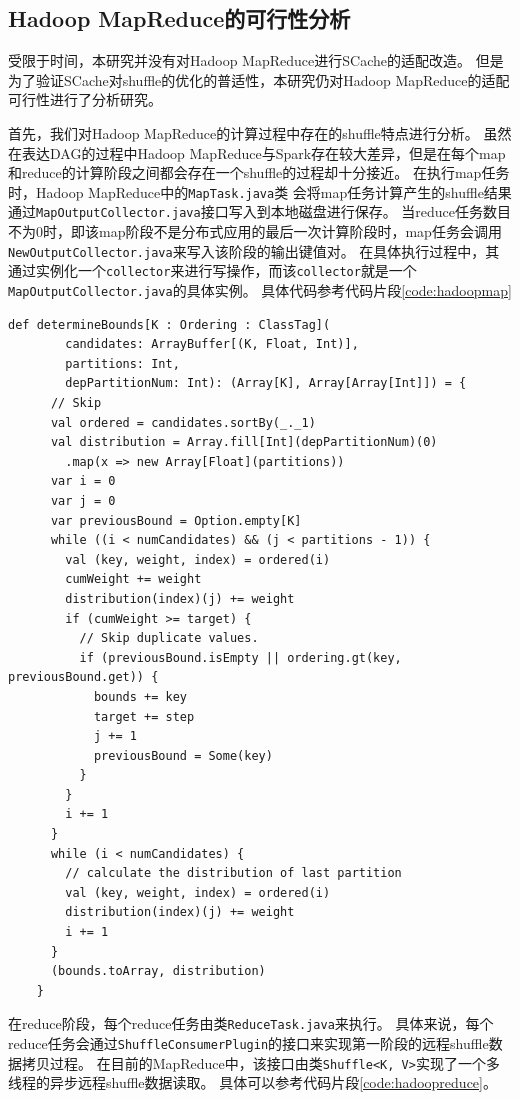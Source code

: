 \subsection{Hadoop MapReduce的可行性分析}

受限于时间，本研究并没有对Hadoop MapReduce进行SCache的适配改造。
但是为了验证SCache对shuffle的优化的普适性，本研究仍对Hadoop MapReduce的适配可行性进行了分析研究。

首先，我们对Hadoop MapReduce的计算过程中存在的shuffle特点进行分析。
虽然在表达DAG的过程中Hadoop MapReduce与Spark存在较大差异，但是在每个map和reduce的计算阶段之间都会存在一个shuffle的过程却十分接近。
在执行map任务时，Hadoop MapReduce中的\verb|MapTask.java|类
会将map任务计算产生的shuffle结果通过\verb|MapOutputCollector.java|接口写入到本地磁盘进行保存。
当reduce任务数目不为0时，即该map阶段不是分布式应用的最后一次计算阶段时，map任务会调用\verb|NewOutputCollector.java|来写入该阶段的输出键值对。
在具体执行过程中，其通过实例化一个\verb|collector|来进行写操作，而该\verb|collector|就是一个\verb|MapOutputCollector.java|的具体实例。
具体代码参考代码片段\ref{code:hadoopmap}

\begin{lstlisting}[style={myScalastyle}, caption={水塘采样代码片段}, label={code:sample}]
    def determineBounds[K : Ordering : ClassTag](
        candidates: ArrayBuffer[(K, Float, Int)],
        partitions: Int,
        depPartitionNum: Int): (Array[K], Array[Array[Int]]) = {
      // Skip
      val ordered = candidates.sortBy(_._1)
      val distribution = Array.fill[Int](depPartitionNum)(0)
        .map(x => new Array[Float](partitions))
      var i = 0
      var j = 0
      var previousBound = Option.empty[K]
      while ((i < numCandidates) && (j < partitions - 1)) {
        val (key, weight, index) = ordered(i)
        cumWeight += weight
        distribution(index)(j) += weight
        if (cumWeight >= target) {
          // Skip duplicate values.
          if (previousBound.isEmpty || ordering.gt(key, previousBound.get)) {
            bounds += key
            target += step
            j += 1
            previousBound = Some(key)
          }
        }
        i += 1
      }
      while (i < numCandidates) {
        // calculate the distribution of last partition
        val (key, weight, index) = ordered(i)
        distribution(index)(j) += weight
        i += 1
      }
      (bounds.toArray, distribution)
    }
\end{lstlisting}

在reduce阶段，每个reduce任务由类\verb|ReduceTask.java|来执行。
具体来说，每个reduce任务会通过\verb|ShuffleConsumerPlugin|的接口来实现第一阶段的远程shuffle数据拷贝过程。
在目前的MapReduce中，该接口由类\verb|Shuffle<K, V>|实现了一个多线程的异步远程shuffle数据读取。
具体可以参考代码片段\ref{code:hadoopreduce}。

